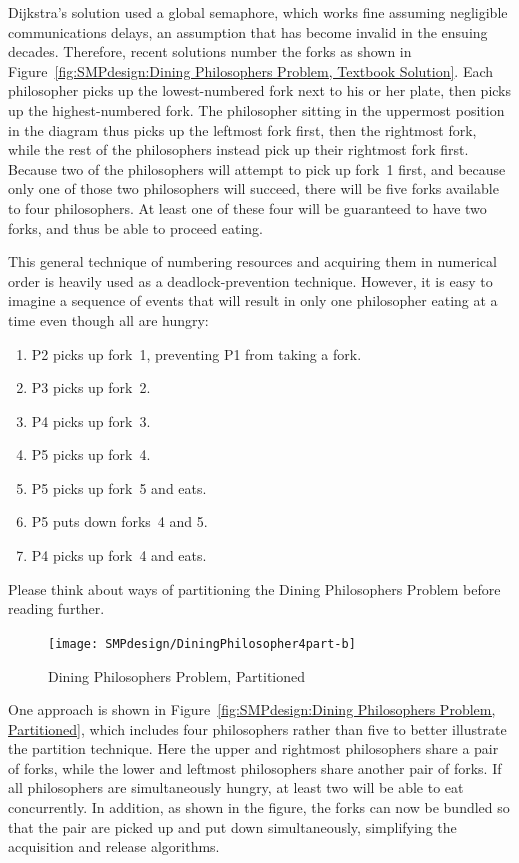 Dijkstra's solution used a global semaphore, which works fine assuming
negligible communications delays, an assumption that has become invalid
in the ensuing decades.
Therefore, recent solutions number the forks as shown in
Figure~\ref{fig:SMPdesign:Dining Philosophers Problem, Textbook Solution}.
Each philosopher picks up the lowest-numbered fork next to his or her
plate, then picks up the highest-numbered fork.
The philosopher sitting in the uppermost position in the diagram thus
picks up the leftmost fork first, then the rightmost fork, while the
rest of the philosophers instead pick up their rightmost fork first.
Because two of the philosophers will attempt to pick up fork~1 first,
and because only one of those two philosophers will succeed,
there will be five forks available to four philosophers.
At least one of these four will be guaranteed to have two forks,
and thus be able to proceed eating.

This general technique of numbering resources and acquiring them in
numerical order is heavily used as a deadlock-prevention technique.
However, it is easy to imagine a sequence of events that will result
in only one philosopher eating at a time even though all are hungry:

\begin{enumerate}
    \item P2 picks up fork~1, preventing P1 from taking a fork.
    \item P3 picks up fork~2.
    \item P4 picks up fork~3.
    \item P5 picks up fork~4.
    \item P5 picks up fork~5 and eats.
    \item P5 puts down forks~4 and 5.
    \item P4 picks up fork~4 and eats.
\end{enumerate}

Please think about ways of partitioning the Dining Philosophers Problem
before reading further.
\cleardoublepage


\begin{figure}[tb]
\begin{center}
\texttt{[image: SMPdesign/DiningPhilosopher4part-b]}
\end{center}
\caption{Dining Philosophers Problem, Partitioned}
\end{figure}

One approach is shown in
Figure~\ref{fig:SMPdesign:Dining Philosophers Problem, Partitioned},
which includes four philosophers rather than five to better illustrate the
partition technique.
Here the upper and rightmost philosophers share a pair of forks,
while the lower and leftmost philosophers share another pair of forks.
If all philosophers are simultaneously hungry, at least two will
be able to eat concurrently.
In addition, as shown in the figure, the forks can now be bundled
so that the pair are picked up and put down simultaneously, simplifying
the acquisition and release algorithms.

